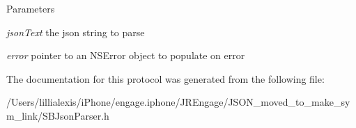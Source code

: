 \begin{DoxyParams}{Parameters}
\item[{\em jsonText}]the json string to parse \item[{\em error}]pointer to an NSError object to populate on error \end{DoxyParams}


The documentation for this protocol was generated from the following file:\begin{DoxyCompactItemize}
\item 
/Users/lillialexis/iPhone/engage.iphone/JREngage/JSON\_\-moved\_\-to\_\-make\_\-sym\_\-link/SBJsonParser.h\end{DoxyCompactItemize}
